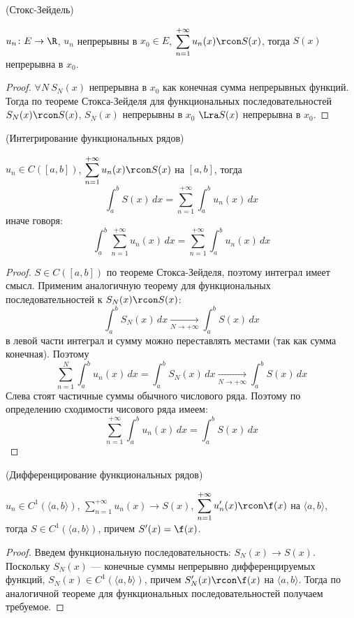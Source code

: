 \begin{theorem}(Стокс-Зейдель)

    $u_n \colon E \to \R$, $u_n$ непрерывны в $x_0 \in E$, $\displaystyle
    \sum_{n = 1}^{+\infty}{u_n(x)} \rcon S(x)$, тогда $S(x)$ непрерывна в
    $x_0$.
\end{theorem}
\begin{proof}
    $\forall N~ S_N(x)$ непрерывна в $x_0$ как конечная сумма непрерывных
    функций. Тогда по теореме Стокса-Зейделя для функциональных
    последовательностей $S_N(x) \rcon S(x)$, $S_N(x)$ непрерывны в $x_0$ $\Lra
    S(x)$ непрерывна в $x_0$.
\end{proof}

\begin{theorem}(Интегрирование функциональных рядов)

    $u_n \in C([a, b])$, $\displaystyle \sum_{n = 1}^{+\infty}{u_n(x)} \rcon
    S(x)$ на $[a, b]$, тогда
\[
    \int_a^b{S(x) \, dx} = \sum_{n = 1}^{+\infty}{\int_a^b{u_n(x) \, dx}}
\]
    иначе говоря:
\[
    \int_a^b{\sum_{n = 1}^{+\infty}{u_n(x)} \, dx} = \sum_{n =
    1}^{+\infty}{\int_a^b{u_n(x) \, dx}}
\]
\end{theorem}
\begin{proof}
    $S \in C([a, b])$ по теореме Стокса-Зейделя, поэтому интеграл имеет
    смысл. Применим аналогичную теорему для функциональных последовательностей
    к $S_N(x) \rcon S(x)$:
\[
    \int_a^b{S_N(x) \, dx} \xrightarrow[N \to +\infty]{} \int_a^b{S(x) \, dx}
\]
    в левой части интеграл и сумму можно переставлять местами (так как сумма
    конечная). Поэтому
\[
    \sum_{n = 1}^{N}{\int_a^b{u_n(x) \, dx}} =
    \int_a^b{S_N(x) \, dx} \xrightarrow[N \to +\infty]{} \int_a^b{S(x) \, dx}
\]
    Слева стоят частичные суммы обычного числового ряда. Поэтому
    по определению сходимости чисового ряда имеем:
\[
    \sum_{n = 1}^{+\infty}{\int_a^b{u_n(x) \, dx}} = \int_a^b{S(x) \, dx}
\]
\end{proof}

\begin{theorem}(Дифференцирование функциональных рядов)

    $u_n \in C^1(\langle a, b \rangle)$, $\displaystyle \sum_{n =
    1}^{+\infty}{u_n(x)} \to S(x)$, $\displaystyle \sum_{n =
    1}^{+\infty}{u'_n(x)} \rcon \f(x)$ на $\langle a, b \rangle$, \\ тогда
    $S \in C^1(\langle a, b \rangle)$, причем $S'(x) = \f(x)$.
\end{theorem}
\begin{proof}
    Введем функциональную последовательность: $S_N(x) \to S(x)$.
    Поскольку $S_N(x)$ --- конечные суммы непрерывно дифференцируемых функций,
    $S_N(x) \in C^1(\langle a, b \rangle)$, причем $S'_N(x) \rcon \f(x)$ на
    $\langle a, b \rangle$. Тогда по аналогичной теореме для функциональных
    последовательностей получаем требуемое.
\end{proof}


